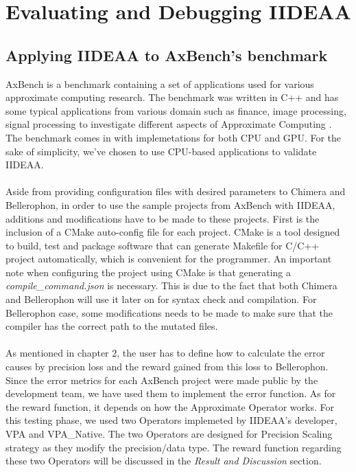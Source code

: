 \section{Evaluating and Debugging IIDEAA}

\subsection{Applying IIDEAA to AxBench's benchmark}

AxBench is a benchmark containing a set of applications used for various approximate computing research. The benchmark was written in C++ and has some typical applications from various domain such as finance, image processing, signal processing to investigate different aspects of Approximate Computing \cite{7755728}. The benchmark comes in with implemetations for both CPU and GPU. For the sake of simplicity, we've chosen to use CPU-based applications to validate IIDEAA. \\
~\\
Aside from providing configuration files with desired parameters to Chimera and Bellerophon, in order to use the sample projects from AxBench with IIDEAA, additions and modifications have to be made to these projects. First is the inclusion of a CMake auto-config file for each project. CMake is a tool designed to build, test and package software that can generate Makefile for C/C++ project automatically, which is convenient for the programmer. An important note when configuring the project using CMake is that generating a \textit{compile\_command.json} is necessary. This is due to the fact that both Chimera and Bellerophon will use it later on for syntax check and compilation. For Bellerophon case, some modifications needs to be made to make sure that the compiler has the correct path to the mutated files. \\
~\\
As mentioned in chapter 2, the user has to define how to calculate the error causes by precision loss and the reward gained from this loss to Bellerophon. Since the error metrics for each AxBench project were made public by the development team, we have used them to implement the error function. As for the reward function, it depends on how the Approximate Operator works. For this testing phase, we used two Operators implemeted by IIDEAA's developer, VPA and VPA\_Native. The two Operators are designed for Precision Scaling strategy as they modify the precision/data type. The reward function regarding these two Operators will be discussed in the \textit{Result and Discussion} section. \\
